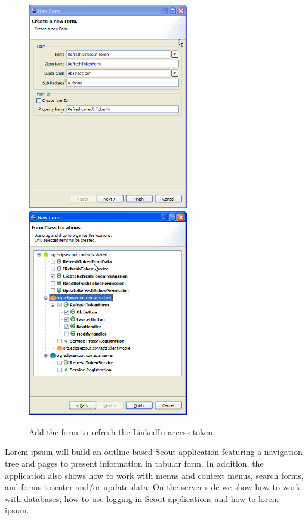 \documentclass[a4paper,10pt,twoside]{book}
\begin{document}
\begin{figure}
\includegraphics[width=7cm]{new_form_token_1.png} \hspace{5mm}
\includegraphics[width=7cm]{new_form_token_2.png}
\caption{Add the form to refresh the LinkedIn access token.}
\end{figure}

Lorem ipsum will build an outline based Scout application featuring a navigation tree and pages to present information in tabular form. 
In addition, the application also shows how to work with menus and context menus, search forms, and forms to enter and/or update data. 
On the server side we show how to work with databases, how to use logging in Scout applications and how to lorem ipsum. 
\end{document}
